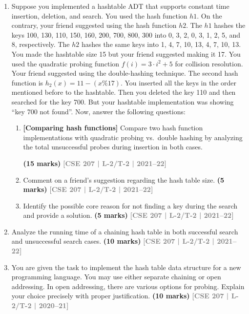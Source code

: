 \documentclass[12pt]{article}
\newcommand{\yr}[1]{\hfill\textcolor{gray}{\small\textbf{[#1]}}}
\newcommand{\mk}[1]{\textcolor{orange!70!black}{\small\textbf{(#1 marks)}}}
\begin{document}
\begin{enumerate}
\item Suppose you implemented a hashtable ADT that supports constant time insertion, deletion, and search. You used the hash function $h1$. On the contrary, your friend suggested using the hash function $h2$. The $h1$ hashes the keys 100, 130, 110, 150, 160, 200, 700, 800, 300 into 0, 3, 2, 0, 3, 1, 2, 5, and 8, respectively. The $h2$ hashes the same keys into 1, 4, 7, 10, 13, 4, 7, 10, 13. You made the hashtable size 15 but your friend suggested making it 17. You used the quadratic probing function $f(i) = 3 \cdot i^2 + 5$ for collision resolution. Your friend suggested using the double-hashing technique. The second hash function is $h_2(x) = 11 - (x \% 17)$. You inserted all the keys in the order mentioned before to the hashtable. Then you deleted the key 110 and then searched for the key 700. But your hashtable implementation was showing ``key 700 not found''. Now, answer the following questions:
\begin{enumerate}
\item \textbf{[Comparing hash functions]} Compare two hash function implementations with quadratic probing vs.\ double hashing by analyzing the total unsuccessful probes during insertion in both cases.
 
\mk{15} \yr{CSE 207 | L-2/T-2 | 2021--22}

\item Comment on a friend's suggestion regarding the hash table size.
\mk{5} \yr{CSE 207 | L-2/T-2 | 2021--22}

\item Identify the possible core reason for not finding a key during the search and provide a solution.
\mk{5} \yr{CSE 207 | L-2/T-2 | 2021--22}

\end{enumerate}



\item Analyze the running time of a chaining hash table in both successful search and unsuccessful search cases.
\mk{10} \yr{CSE 207 | L-2/T-2 | 2021--22}


\item You are given the task to implement the hash table data structure for a new programming language. You may use either separate chaining or open addressing. In open addressing, there are various options for probing. Explain your choice precisely with proper justification.
\mk{10} \yr{CSE 207 | L-2/T-2 | 2020--21}





\end{enumerate}
\end{document}
